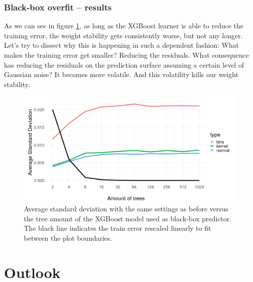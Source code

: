 \documentclass[]{krantz}
\begin{document}
\subsubsection{Black-box overfit --
results}\label{black-box-overfit-results}

As we can see in figure \ref{fig:figoverfit}, as long as the XGBoost
learner is able to reduce the training error, the weight stability gets
consistently worse, but not any longer. Let's try to dissect why this is
happening in such a dependent fashion: What makes the training error get
smaller? Reducing the residuals. What consequence has reducing the
residuals on the prediction surface assuming a certain level of Gaussian
noise? It becomes more volatile. And this volatility kills our weight
stability.

\begin{figure}

{\centering \includegraphics[width=0.99\linewidth]{images/sd_overfitting_presi2} 

}

\caption{Average standard deviation with the same settings as before versus the tree amount of the XGBoost model used as black-box predictor. The black line indicates the train error rescaled linearly to fit between the plot boundaries.}\label{fig:figoverfit}
\end{figure}

\section{Outlook}\label{outlook-2}
\end{document}
